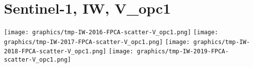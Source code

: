 
\section{Sentinel-1, IW, V\_opc1}
\setcounter{theorem}{0}

\renewcommand{\theenumi}{\roman{enumi}}
\renewcommand{\labelenumi}{\textnormal{(\theenumi)}$\;\;$}


\begin{center}
\begin{minipage}{7.0in}
\texttt{[image: graphics/tmp-IW-2016-FPCA-scatter-V\_opc1.png]}
\quad
\texttt{[image: graphics/tmp-IW-2017-FPCA-scatter-V\_opc1.png]}
\vskip 0.5cm
\texttt{[image: graphics/tmp-IW-2018-FPCA-scatter-V\_opc1.png]}
\quad
\texttt{[image: graphics/tmp-IW-2019-FPCA-scatter-V\_opc1.png]}
\end{minipage}
\end{center}


\renewcommand{\theenumi}{\roman{enumi}}
\renewcommand{\labelenumi}{\textnormal{(\theenumi)}$\;\;$}

